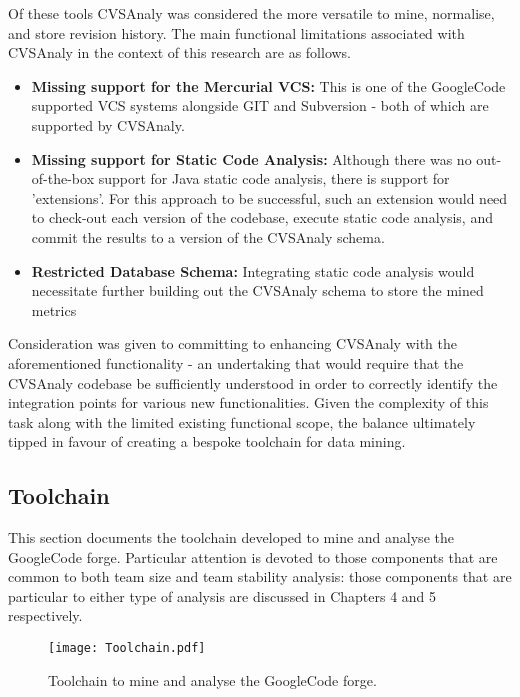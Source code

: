 Of these tools CVSAnaly was considered the more versatile to mine, normalise, and store revision history. The main functional limitations associated with CVSAnaly in the context of this research are as follows.

\begin{itemize}
\item \textbf{Missing support for the Mercurial VCS:} This is one of the GoogleCode supported VCS systems alongside GIT and Subversion - both of which are supported by CVSAnaly.
\item \textbf{Missing support for Static Code Analysis:} Although there was no out-of-the-box support for Java static code analysis, there is support for 'extensions'. For this approach to be successful, such an extension would need to check-out each version of the codebase, execute static code analysis, and commit the results to a version of the CVSAnaly schema.
\item \textbf{Restricted Database Schema:} Integrating static code analysis would necessitate further building out the CVSAnaly schema to store the mined metrics 
\end{itemize}

Consideration was given to committing to enhancing CVSAnaly with the aforementioned functionality - an undertaking that would require that the CVSAnaly codebase be sufficiently understood in order to correctly identify the integration points for various new functionalities. Given the complexity of this task along with the limited existing functional scope, the balance ultimately tipped in favour of creating a bespoke toolchain for data mining. 

\subsection{Toolchain}
This section documents the toolchain developed to mine and analyse the GoogleCode forge. Particular attention is devoted to those components that are common to both team size and team stability analysis: those components that are particular to either type of analysis are discussed in Chapters 4 and 5 respectively.

\begin{figure}[htbp!] 
\centering    
\texttt{[image: Toolchain.pdf]}
\caption{Toolchain to mine and analyse the GoogleCode forge.}
\label{fig:Toolchain}
\end{figure}


